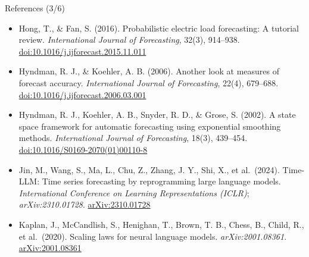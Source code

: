 \begin{frame}{References (3/6)}
\begin{itemize}
    \item Hong, T., \& Fan, S. (2016). Probabilistic electric load forecasting: A tutorial review. \textit{International Journal of Forecasting}, 32(3), 914--938. \href{https://doi.org/10.1016/j.ijforecast.2015.11.011}{doi:10.1016/j.ijforecast.2015.11.011}
    \item Hyndman, R. J., \& Koehler, A. B. (2006). Another look at measures of forecast accuracy. \textit{International Journal of Forecasting}, 22(4), 679--688. \href{https://doi.org/10.1016/j.ijforecast.2006.03.001}{doi:10.1016/j.ijforecast.2006.03.001}
    \item Hyndman, R. J., Koehler, A. B., Snyder, R. D., \& Grose, S. (2002). A state space framework for automatic forecasting using exponential smoothing methods. \textit{International Journal of Forecasting}, 18(3), 439--454. \href{https://doi.org/10.1016/S0169-2070(01)00110-8}{doi:10.1016/S0169-2070(01)00110-8}
    \item Jin, M., Wang, S., Ma, L., Chu, Z., Zhang, J. Y., Shi, X., et al.\ (2024). Time-LLM: Time series forecasting by reprogramming large language models. \textit{International Conference on Learning Representations (ICLR)}; \textit{arXiv:2310.01728}. \href{https://arxiv.org/abs/2310.01728}{arXiv:2310.01728}
    \item Kaplan, J., McCandlish, S., Henighan, T., Brown, T. B., Chess, B., Child, R., et al.\ (2020). Scaling laws for neural language models. \textit{arXiv:2001.08361}. \href{https://arxiv.org/abs/2001.08361}{arXiv:2001.08361}
\end{itemize}
\end{frame}

